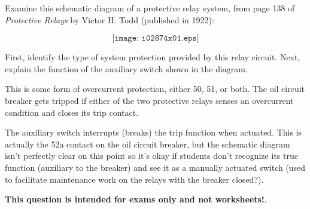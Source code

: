 

Examine this schematic diagram of a protective relay system, from page 138 of {\it Protective Relays} by Victor H. Todd (published in 1922):

$$\texttt{[image: i02874x01.eps]}$$

First, identify the type of system protection provided by this relay circuit.  Next, explain the function of the auxiliary switch shown in the diagram.

\vskip 10pt







This is some form of overcurrent protection, either 50, 51, or both.  The oil circuit breaker gets tripped if either of the two protective relays senses an overcurrent condition and closes its trip contact.

\vskip 10pt

The auxiliary switch interrupts (breaks) the trip function when actuated.  This is actually the 52a contact on the oil circuit breaker, but the schematic diagram isn't perfectly clear on this point so it's okay if students don't recognize its true function (auxiliary to the breaker) and see it as a manually actuated switch (used to facilitate maintenance work on the relays with the breaker closed?).







{\bf This question is intended for exams only and not worksheets!}.



